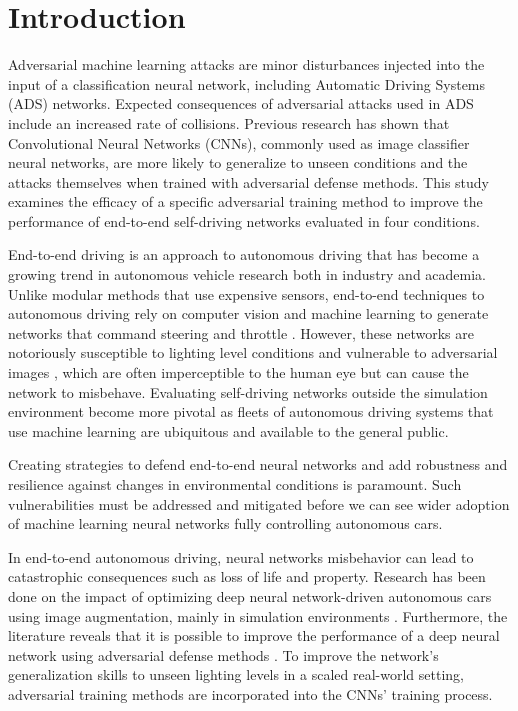 \documentclass[12pt]{article}
\begin{document}


\newpage
\tableofcontents


\newpage
\section{Introduction}

Adversarial machine learning attacks are minor disturbances injected into the input of a classification neural network, including Automatic Driving Systems (ADS) networks. Expected consequences of adversarial attacks used in ADS include an increased rate of collisions. Previous research has shown that Convolutional Neural Networks (CNNs), commonly used as image classifier neural networks, are more likely to generalize to unseen conditions and the attacks themselves when trained with adversarial defense methods. This study examines the efficacy of a specific adversarial training method to improve the performance of end-to-end self-driving networks evaluated in four conditions.

End-to-end driving is an approach to autonomous driving that has become a growing trend in autonomous vehicle research both in industry and academia. Unlike modular methods that use expensive sensors, end-to-end techniques to autonomous driving rely on computer vision and machine learning to generate networks that command steering and throttle \parencite{tampuu}. However, these networks are notoriously susceptible to lighting level conditions and vulnerable to adversarial images \parencite{piazzesi}, which are often imperceptible to the human eye but can cause the network to misbehave. Evaluating self-driving networks outside the simulation environment become more pivotal as fleets of autonomous driving systems that use machine learning are ubiquitous and available to the general public.

Creating strategies to defend end-to-end neural networks and add robustness and resilience against changes in environmental conditions is paramount. Such vulnerabilities must be addressed and mitigated before we can see wider adoption of machine learning neural networks fully controlling autonomous cars. 

In end-to-end autonomous driving, neural networks misbehavior can lead to catastrophic consequences such as loss of life and property. Research has been done on the impact of optimizing deep neural network-driven autonomous cars using image augmentation, mainly in simulation environments \parencite{Mahmoud}. Furthermore, the literature reveals that it is possible to improve the performance of a deep neural network using adversarial defense methods \parencite{Rosebrock}. To improve the network's generalization skills to unseen lighting levels in a scaled real-world setting, adversarial training methods are incorporated into the CNNs' training process. 
\end{document}
